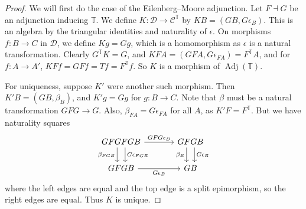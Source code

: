 \begin{proof}
    We will first do the case of the Eilenberg--Moore adjunction.
    Let \( F \dashv G \) be an adjunction inducing \( \mathbb T \).
    We define \( K : \mathcal D \to \mathcal C^{\mathbb T} \) by \( KB = (GB, G\epsilon_B) \).
    This is an algebra by the triangular identities and naturality of \( \epsilon \).
    On morphisms \( f : B \to C \) in \( \mathcal D \), we define \( Kg = Gg \), which is a homomorphism as \( \epsilon \) is a natural transformation.
    Clearly \( G^{\mathbb T}K = G \), and \( KFA = (GFA, G\epsilon_{FA}) = F^{\mathbb T}A \), and for \( f : A \to A' \), \( KFf = GFf = Tf = F^{\mathbb T} f \).
    So \( K \) is a morphism of \( \operatorname{Adj}(\mathbb T) \).

    For uniqueness, suppose \( K' \) were another such morphism.
    Then \( K'B = (GB, \beta_B) \), and \( K'g = Gg \) for \( g : B \to C \).
    Note that \( \beta \) must be a natural transformation \( GFG \to G \).
    Also, \( \beta_{FA} = G\epsilon_{FA} \) for all \( A \), as \( K'F = F^{\mathbb T} \).
    But we have naturality squares
\[\begin{tikzcd}[column sep=large]
	GFGFGB & GFGB \\
	GFGB & GB
	\arrow["{\beta_{FGB}}"', shift right=2, from=1-1, to=2-1]
	\arrow["{GFG\epsilon_B}", from=1-1, to=1-2]
	\arrow["{G\epsilon_B}"', from=2-1, to=2-2]
	\arrow["{G\epsilon_{FGB}}", shift left=2, from=1-1, to=2-1]
	\arrow["{\beta_B}"', shift right=2, from=1-2, to=2-2]
	\arrow["{G\epsilon_B}", shift left=2, from=1-2, to=2-2]
\end{tikzcd}\]
    where the left edges are equal and the top edge is a split epimorphism, so the right edges are equal.
    Thus \( K \) is unique.


\end{proof}
